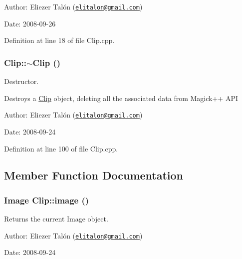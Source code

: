 \begin{Desc}
\item[Author:]Eliezer Talón (\href{mailto:elitalon@gmail.com}{\tt elitalon@gmail.com}) \end{Desc}
\begin{Desc}
\item[Date:]2008-09-26 \end{Desc}


Definition at line 18 of file Clip.cpp.\hypertarget{class_clip_88647ed65e3482b5e0533ec98667b0fa}{
\subsubsection[$\sim$Clip]{\setlength{\rightskip}{0pt plus 5cm}Clip::$\sim$Clip ()}}
\label{class_clip_88647ed65e3482b5e0533ec98667b0fa}


Destructor. 

Destroys a \hyperlink{class_clip}{Clip} object, deleting all the associated data from Magick++ API

\begin{Desc}
\item[Author:]Eliezer Talón (\href{mailto:elitalon@gmail.com}{\tt elitalon@gmail.com}) \end{Desc}
\begin{Desc}
\item[Date:]2008-09-24 \end{Desc}


Definition at line 100 of file Clip.cpp.

\subsection{Member Function Documentation}
\hypertarget{class_clip_f4500103f1babcf2b9283eaffc6af96a}{
\subsubsection[image]{\setlength{\rightskip}{0pt plus 5cm}Image Clip::image ()}}
\label{class_clip_f4500103f1babcf2b9283eaffc6af96a}


Returns the current Image object. 

\begin{Desc}
\item[Author:]Eliezer Talón (\href{mailto:elitalon@gmail.com}{\tt elitalon@gmail.com}) \end{Desc}
\begin{Desc}
\item[Date:]2008-09-24 \end{Desc}


